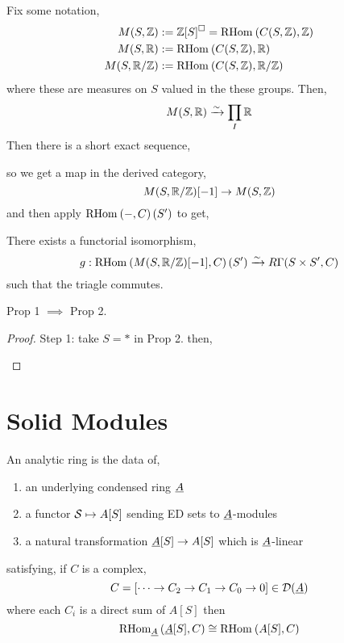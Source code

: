 \documentclass[12pt]{article}
\newcommand{\sol}{\square}
\begin{document}
Fix some notation,
\begin{align*}
M(S, \Z) & := \Z[S]^\sol = \RHom{}{C(S, \Z)}{\Z}
\\
M(S, \RR) & := \RHom{}{C(S, \Z)}{\R}
\\
M(S, \RR/\ZZ) & := \RHom{}{C(S, \Z)}{\RR/\ZZ} 
\end{align*}
where these are measures on $S$ valued in the these groups. Then,
\[ M(S, \RR) \iso \prod_I \RR \]
Then there is a short exact sequence,
\begin{center}
\end{center}
so we get a map in the derived category,
\[ M(S, \RR/\ZZ)[-1] \to M(S, \ZZ) \]
and then apply $\RHom{}{-}{C}(S')$ to get,
\begin{center}
\end{center}

\begin{prop}
There exists a functorial isomorphism,
\[ g : \RHom{}{M(S, \RR/\ZZ)[-1]}{C}(S') \iso R \Gamma(S \times S', C) \]
such that the triagle commutes.
\end{prop}

\begin{prop}
Prop 1 $\implies$ Prop 2.
\end{prop}

\begin{proof}
Step 1: take $S = *$ in Prop 2. then,
\begin{center}
\end{center}
\end{proof}

\section{Solid Modules}

\begin{defn}
An analytic ring is the data of,
\begin{enumerate}
\item an underlying condensed ring $\ul{A}$
\item a functor $\S \mapsto A[S]$ sending ED sets to $\ul{A}$-modules
\item a natural transformation $\ul{A}[S] \to A[S]$ which is $\ul{A}$-linear
\end{enumerate}
satisfying, if $C$ is a complex,
\[ C = [ \dots \to C_2 \to C_1 \to C_0 \to 0 ] \in \D(\ul{A}) \]
where each $C_i$ is a direct sum of $A[S]$ then 
\[ \RHom{\ul{A}}{\ul{A}[S]}{C} \cong \RHom{}{A[S]}{C} \]
\end{defn}
\end{document}
